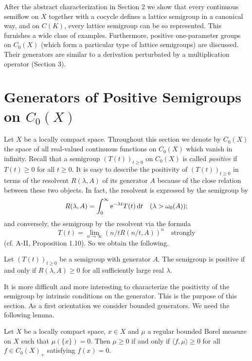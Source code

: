 After the abstract characterization in Section 2 we show that every continuous semiflow on $X$ together with a cocycle defines a lattice semigroup in a canonical way, and on $C(K)$, every lattice semigroup can be so represented.
This furnishes a wide class of examples.
Furthermore, positive one-parameter groups on $C_{0}(X)$ (which form a particular type of lattice semigroups) are discussed.
Their generators are similar to a derivation perturbated by a multiplication operator (Section 3).

\section{Generators of Positive Semigroups on  \texorpdfstring{$C_{0}(X)$}{C(X)}} \label{sec:b2-1}%
Let $X$ be a locally compact space.
Throughout this section we denote by $C_{0}(X)$ the space of all real-valued continuous functions on $C_{0}(X)$ which vanish in infinity.
Recall that a semigroup $(T(t))_{t \geq 0}$ on $C_{0}(X)$ is called \emph{positive} if $T(t) \geq 0$ for all $t \geq 0$.
It is easy to describe the positivity of $(T(t))_{t \geq 0}$ in terms of the resolvent $R(\lambda,A)$ of its generator $A$ because of the close relation between these two objects.
In fact, the resolvent is expressed by the semigroup by
\begin{equation}\label{eq:b2-1.1}
R(\lambda,A) = \int_{0}^{\infty} \mathrm{e}^{-\lambda t} T(t) \mathop{}\!\mathrm{d}{t} \quad (\lambda > \omega_{0}(A));
\end{equation}
and conversely, the semigroup by the resolvent via the formula
\begin{equation}\label{eq:b2-1.2}
T(t) = \lim_{n \to \infty} (n/tR(n/t,A))^{n} \quad \text{strongly}
\end{equation}
(cf. A-II, Proposition 1.10).
So we obtain the following.
\begin{proposition}\label{prop:b2-1.1}
Let $(T(t))_{t \geq 0}$ be a semigroup with generator $A$.
The semigroup is positive if and only if $R(\lambda,A) \geq 0$ for all sufficiently large real $\lambda$.
\end{proposition}
It is more difficult and more interesting to characterize the positivity of the semigroup by intrinsic conditions on the generator.
This is the purpose of this section.
As a first orientation we consider bounded generators.
We need the following lemma.
\begin{lemma}\label{lem:b2-1.2}
Let $X$ be a locally compact space, $x \in X$ and $\mu$ a regular bounded Borel measure on $X$ such that $\mu(\{x\}) = 0$.
Then $\mu \geq 0$ if and only if $\langle f,\mu \rangle \geq 0$ for all $f \in C_{0}(X)_{+}$ satisfying $f(x) = 0$.
\end{lemma}
